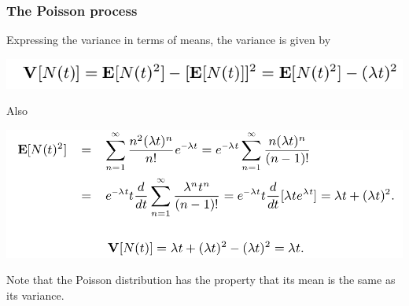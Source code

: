 \documentclass[spanish]{beamer}
\begin{document}
\begin{frame}
\frametitle{The Poisson process}
Expressing the variance in terms of means, the variance is given by

\begin{center}
\includegraphics[scale=0.34]{im10}
\end{center}

Also

\begin{center}
\includegraphics[scale=0.32]{im8}
\end{center}

Note that the Poisson distribution has the property that its mean is the same as its variance.
\end{frame}
\end{document}

